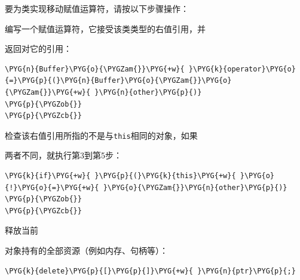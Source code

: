 
要为类实现移动赋值运算符，请按以下步骤操作：



编写一个赋值运算符，它接受该类类型的右值引用，并



返回对它的引用：



\begin{codeblockbg}
\begin{Verbatim}[commandchars=\\\{\},breaklines=true,breakanywhere=true,fontsize=\codefont,xleftmargin=17bp]
\PYG{n}{Buffer}\PYG{o}{\PYGZam{}}\PYG{+w}{ }\PYG{k}{operator}\PYG{o}{=}\PYG{p}{(}\PYG{n}{Buffer}\PYG{o}{\PYGZam{}}\PYG{o}{\PYGZam{}}\PYG{+w}{ }\PYG{n}{other}\PYG{p}{)}
\PYG{p}{\PYGZob{}}
\PYG{p}{\PYGZcb{}}
\end{Verbatim}
\end{codeblockbg}



检查该右值引用所指的不是与\texttt{this}相同的对象，如果



两者不同，就执行第3到第5步：



\begin{codeblockbg}
\begin{Verbatim}[commandchars=\\\{\},breaklines=true,breakanywhere=true,fontsize=\codefont,xleftmargin=17bp]
\PYG{k}{if}\PYG{+w}{ }\PYG{p}{(}\PYG{k}{this}\PYG{+w}{ }\PYG{o}{!}\PYG{o}{=}\PYG{+w}{ }\PYG{o}{\PYGZam{}}\PYG{n}{other}\PYG{p}{)}
\PYG{p}{\PYGZob{}}
\PYG{p}{\PYGZcb{}}
\end{Verbatim}
\end{codeblockbg}



释放当前



对象持有的全部资源（例如内存、句柄等）：



\begin{codeblockbg}
\begin{Verbatim}[commandchars=\\\{\},breaklines=true,breakanywhere=true,fontsize=\codefont,xleftmargin=17bp]
\PYG{k}{delete}\PYG{p}{[}\PYG{p}{]}\PYG{+w}{ }\PYG{n}{ptr}\PYG{p}{;}
\end{Verbatim}
\end{codeblockbg}



